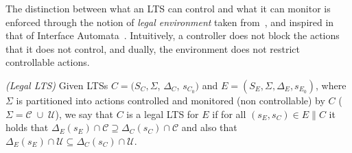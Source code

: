 The distinction between what an LTS can control and what it can monitor is enforced through the notion of 
{\em legal environment} taken from~\cite{DIppolito:2013}, and inspired in that of Interface Automata~\cite{DBLP:conf/sigsoft/AlfaroH01}.
Intuitively, a controller does not block the actions that it does not control, and dually, the environment does not restrict controllable actions. 

\begin{definition} \label{def:IALTS} \emph{(Legal LTS)}
	Given LTSs $C = (S_C, \Sigma$, $\Delta_C$, $s_{C_0})$ and $E = (S_E,\Sigma,\Delta_E,s_{E_0})$, where $\Sigma$ is partitioned into actions controlled and monitored (non controllable) by $C$ ($\Sigma=\mathcal{C} \; \cup \;\mathcal{U}$), we say that $C$ is a legal LTS for $E$ if for all $(s_E,s_C) \in E\|C$ it holds that
	$\Delta_{E}(s_E)\cap \mathcal{C} \supseteq \Delta_{C}(s_C)\cap \mathcal{C}$ and also that  $\Delta_{E}(s_E)\cap \mathcal{U} \subseteq \Delta_{C}(s_C)\cap \mathcal{U}$.
	
\end{definition}





